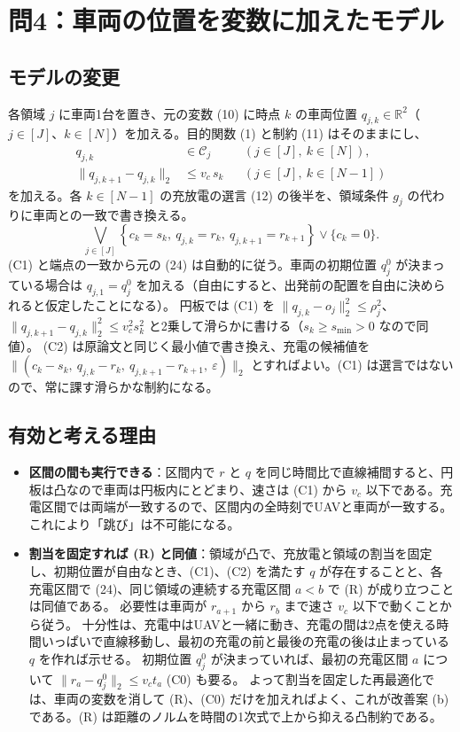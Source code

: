 \documentclass[uplatex,dvipdfmx,a4paper,11pt,jafont=haranoaji]{bxjsarticle}
\newcommand{\answerpart}[1]{\par\Needspace{6\baselineskip}\subsection*{#1}}
\newcommand{\norm}[1]{\lVert #1\rVert_2}
\begin{document}
\FloatBarrier
\section{問4：車両の位置を変数に加えたモデル}

\answerpart{モデルの変更}
各領域 $j$ に車両1台を置き、元の変数 (10) に時点 $k$ の車両位置 $q_{j,k}\in\mathbb R^2$（$j\in[J]$、$k\in[N]$）を加える。目的関数 (1) と制約 (11) はそのままにし、
\begin{equation*}
  \begin{aligned}
  q_{j,k}&\in\mathcal C_j &&(j\in[J],\ k\in[N]),\\
  \norm{q_{j,k+1}-q_{j,k}}&\le v_c\,s_k &&(j\in[J],\ k\in[N-1])
  \end{aligned} \tag{C1}
\end{equation*}
を加える。各 $k\in[N-1]$ の充放電の選言 (12) の後半を、領域条件 $g_j$ の代わりに車両との一致で書き換える。
\begin{equation*}
  \bigvee_{j\in[J]}\left\{c_k=s_k,\ q_{j,k}=r_k,\ q_{j,k+1}=r_{k+1}\right\}\vee\{c_k=0\}. \tag{C2}
\end{equation*}
(C1) と端点の一致から元の (24) は自動的に従う。車両の初期位置 $q_j^0$ が決まっている場合は $q_{j,1}=q_j^0$ を加える（自由にすると、出発前の配置を自由に決められると仮定したことになる）。
円板では (C1) を $\norm{q_{j,k}-o_j}^2\le\rho_j^2$、$\norm{q_{j,k+1}-q_{j,k}}^2\le v_c^2s_k^2$ と2乗して滑らかに書ける（$s_k\ge s_{\min}>0$ なので同値）。
(C2) は原論文と同じく最小値で書き換え、充電の候補値を $\norm{(c_k-s_k,\ q_{j,k}-r_k,\ q_{j,k+1}-r_{k+1},\ \varepsilon)}$ とすればよい。(C1) は選言ではないので、常に課す滑らかな制約になる。

\answerpart{有効と考える理由}
\begin{itemize}
  \item \textbf{区間の間も実行できる}：区間内で $r$ と $q$ を同じ時間比で直線補間すると、円板は凸なので車両は円板内にとどまり、速さは (C1) から $v_c$ 以下である。充電区間では両端が一致するので、区間内の全時刻でUAVと車両が一致する。これにより「跳び」は不可能になる。
  \item \textbf{割当を固定すれば (R) と同値}：領域が凸で、充放電と領域の割当を固定し、初期位置が自由なとき、(C1)、(C2) を満たす $q$ が存在することと、各充電区間で (24)、同じ領域の連続する充電区間 $a<b$ で (R) が成り立つことは同値である。
  必要性は車両が $r_{a+1}$ から $r_b$ まで速さ $v_c$ 以下で動くことから従う。
  十分性は、充電中はUAVと一緒に動き、充電の間は2点を使える時間いっぱいで直線移動し、最初の充電の前と最後の充電の後は止まっている $q$ を作れば示せる。
  初期位置 $q_j^0$ が決まっていれば、最初の充電区間 $a$ について $\norm{r_a-q_j^0}\le v_ct_a$ (C0) も要る。
  よって割当を固定した再最適化では、車両の変数を消して (R)、(C0) だけを加えればよく、これが改善案 (b) である。(R) は距離のノルムを時間の1次式で上から抑える凸制約である。
\end{itemize}
\end{document}
